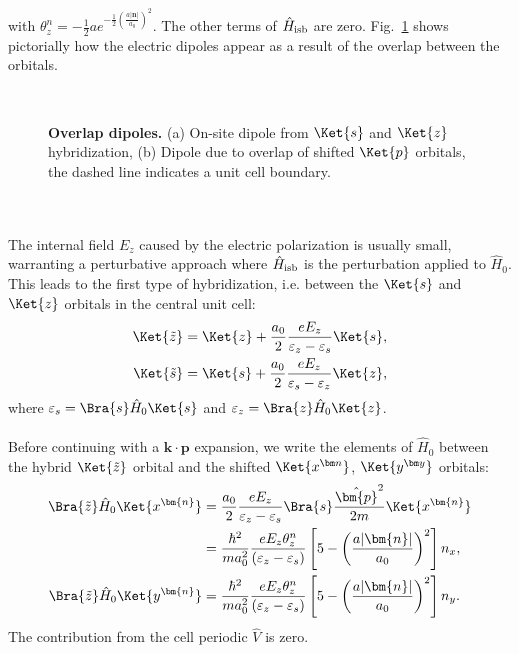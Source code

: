 with $\theta_z^n = -\frac{1}{2}ae^{-\frac{1}{2}\left(\frac{a|\bm{n}|}{a_0}\right)^2}$.
The other terms of $\hat{H}_{\rm isb}$ are zero.
Fig.~\ref{fig:Rashba_overlapdip} shows pictorially how the electric dipoles appear as a result of the overlap between the orbitals. 
\begin{figure}[t]
~\centering
{}\caption{\label{fig:Rashba_overlapdip} {\bf Overlap dipoles.} (a) On-site dipole from $\Ket{s}$ and $\Ket{z}$ hybridization, (b) Dipole due to overlap of shifted $\Ket{p}$ orbitals, the dashed line indicates a unit cell boundary.}
\end{figure}
\\\\
The internal field $E_z$ caused by the electric polarization is usually small, warranting a perturbative approach where $\hat{H}_{\rm isb}$ is the perturbation applied to $\hat{H}_0$.
This leads to the first type of hybridization, i.e. between the $\Ket{s}$ and $\Ket{z}$ orbitals in the central unit cell:
\begin{align}
	\Ket{\tilde{z}} &= \Ket{z} + \frac{a_0}{2}\frac{e E_z}{\varepsilon_z - \varepsilon_s}\Ket{s},\\
	\Ket{\tilde{s}}   &= \Ket{s} +\frac{a_0}{2}\frac{e E_z}{\varepsilon_s - \varepsilon_z}\Ket{z},
\end{align}
where $\varepsilon_s = \Bra{s} \hat{H}_0 \Ket{s}$ and $\varepsilon_z = \Bra{z} \hat{H}_0 \Ket{z}$.
\\\\
Before continuing with a $\bm k \cdot \bm p$ expansion, we write the elements of $\hat{H}_0$ between the hybrid $\Ket{\tilde{z}}$ orbital and the shifted $\Ket{x^{\bm n}}$, $\Ket{y^{\bm y}}$ orbitals:
\begin{align}
	\Bra{\tilde{z}} \hat{H}_0 \Ket{x^{\bm{n}}} &=\frac{a_0}{2} \frac{e E_z}{\varepsilon_z - \varepsilon_s}\Bra{s} \frac{\hat{\bm{p}}^2}{2m} \Ket{x^{\bm{n}}}\\
	&= \frac{\hbar^2}{m a_0^2}\frac{e E_z \theta_z^n}{(\varepsilon_z - \varepsilon_s)} \left[5 - \left(\frac{a |\bm{n}|}{a_0}\right)^2\right]n_x,\\
	\Bra{\tilde{z}} \hat{H}_0 \Ket{y^{\bm{n}}} &=\frac{\hbar^2}{m a_0^2} \frac{e E_z\theta_z^n}{(\varepsilon_z - \varepsilon_s)}\left[5 - \left(\frac{a |\bm{n}|}{a_0}\right)^2\right]n_y.
\end{align}
The contribution from the cell periodic $\hat{V}$ is zero.
\\\\
